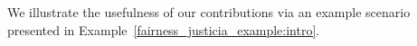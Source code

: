 
We illustrate the usefulness of our contributions via an example scenario presented in Example~\ref{fairness_justicia_example:intro}. 




